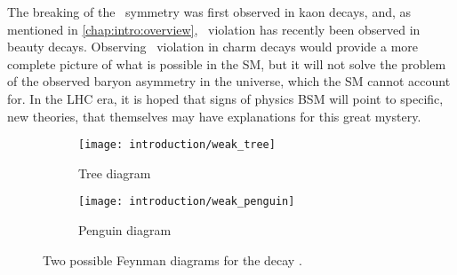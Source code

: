 The breaking of the \CP\ symmetry was first observed in kaon decays, and, as mentioned in \cref{chap:intro:overview}, \CP\ violation has recently been observed in beauty decays.
Observing \CP\ violation in charm decays would provide a more complete picture of what is possible in the \ac{SM}, but it will not solve the problem of the observed baryon asymmetry in the universe, which the \ac{SM} cannot account for.
In the \ac{LHC} era, it is hoped that signs of physics \acl{BSM} will point to specific, new theories, that themselves may have explanations for this great mystery.

\begin{figure}
  \begin{subfigure}{0.40\textwidth}
    \centering
    \texttt{[image: introduction/weak\_tree]}
    \caption{Tree diagram}
    \label{fig:intro:sm:weak_feynman:tree}
  \end{subfigure}
  \begin{subfigure}{0.55\textwidth}
    \centering
    \texttt{[image: introduction/weak\_penguin]}
    \caption{Penguin diagram}
    \label{fig:intro:sm:weak_feynman:penguin}
  \end{subfigure}
  \caption{%
    Two possible Feynman diagrams for the decay \decay{\PBzero}{\PKplus\Ppiminus}.
  }
  \label{fig:intro:sm:weak_feynman}
\end{figure}
